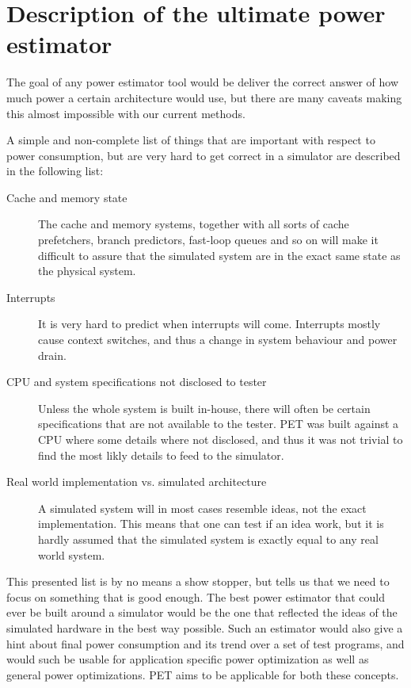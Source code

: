 \section{Description of the ultimate power estimator}
The goal of any power estimator tool would be deliver the correct answer
of how much power a certain architecture would use, but there are many
caveats making this almost impossible with our current methods.

A simple and non-complete list of things that are important with respect to power consumption,
but are very hard to get correct in a simulator are described in the following list:
    \begin{description}
    \item[Cache and memory state]
        The cache and memory systems, together with all sorts of cache prefetchers, branch predictors,
        fast-loop queues and so on will make it difficult to assure that the simulated system are in
        the exact same state as the physical system.
    \item[Interrupts]
        It is very hard to predict when interrupts will come. Interrupts mostly cause context switches,
        and thus a change in system behaviour and power drain.
    \item[CPU and system specifications not disclosed to tester]
        Unless the whole system is built in-house, there will often be certain specifications that
        are not available to the tester. PET was built against a CPU where some details where not disclosed,
        and thus it was not trivial to find the most likly details to feed to the simulator.
    \item[Real world implementation vs. simulated architecture]
        A simulated system will in most cases resemble ideas, not the exact implementation. This means
        that one can test if an idea work, but it is hardly assumed that the simulated system is exactly
        equal to any real world system.
    \end{description}
This presented list is by no means a show stopper, but tells us
that we need to focus on something that is good enough. The best power estimator that could
ever be built around a simulator would be the one that reflected the ideas of the simulated
hardware in the best way possible. Such an estimator would also give a hint about final power
consumption and its trend over a set of test programs, and would such be usable for application
specific power optimization as well as general power optimizations. PET aims to be applicable for
both these concepts.
